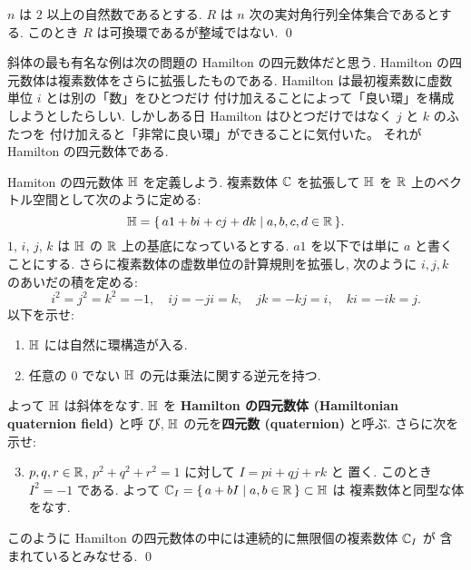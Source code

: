 \documentclass[12pt,twoside]{jarticle}
\begin{document}
\begin{example}
 $n$ は $2$ 以上の自然数であるとする.
 $R$ は $n$ 次の実対角行列全体集合であるとする.
 このとき $R$ は可換環であるが整域ではない.
 \qed
\end{example}

斜体の最も有名な例は次の問題の Hamilton の四元数体だと思う.
Hamilton の四元数体は複素数体をさらに拡張したものである.
Hamilton は最初複素数に虚数単位 $i$ とは別の「数」をひとつだけ
付け加えることによって「良い環」を構成しようとしたらしい.
しかしある日 Hamilton はひとつだけではなく $j$ と $k$ のふたつを
付け加えると「非常に良い環」ができることに気付いた。
それが Hamilton の四元数体である.

\begin{question}
 \label{q:quarternion-1}
 Hamiton の四元数体 ${\mathbb H}$ を定義しよう.
 複素数体 ${\mathbb C}$ を拡張して %
 ${\mathbb H}$ を ${\mathbb R}$ 上のベクトル空間として次のように定める:
 \begin{equation*}
  {\mathbb H} = \{\, a1 + bi + cj + dk \mid a,b,c,d\in{\mathbb R} \,\}.
 \end{equation*}
 $1$, $i$, $j$, $k$ は ${\mathbb H}$ の ${\mathbb R}$ 上の基底になっているとする.
 $a1$ を以下では単に $a$ と書くことにする.
 さらに複素数体の虚数単位の計算規則を拡張し, 
 次のように $i,j,k$ のあいだの積を定める:
 \begin{equation*}
  i^2=j^2=k^2=-1, \quad ij=-ji=k, \quad jk=-kj=i, \quad ki=-ik=j.
 \end{equation*}
 以下を示せ:
 \begin{enumerate}
  \item ${\mathbb H}$ には自然に環構造が入る.
  \item 任意の $0$ でない ${\mathbb H}$ の元は乗法に関する逆元を持つ.
 \end{enumerate}
 よって ${\mathbb H}$ は斜体をなす.
 ${\mathbb H}$ を {\bf Hamilton の四元数体 (Hamiltonian quaternion field)} と呼
 び, ${\mathbb H}$ の元を{\bf 四元数 (quaternion)} と呼ぶ.
 さらに次を示せ:
 \begin{enumerate}
  \setcounter{enumi}{2}
  \item $p,q,r\in{\mathbb R}$, $p^2+q^2+r^2=1$ に対して $I=pi+qj+rk$ と
   置く. このとき $I^2=-1$ である. 
  よって ${\mathbb C}_I=\{\,a+bI\mid a,b\in{\mathbb R}\,\}\subset{\mathbb H}$ は
  複素数体と同型な体をなす.
 \end{enumerate}
 このように Hamilton の四元数体の中には連続的に無限個の複素数体 ${\mathbb C}_I$ が
 含まれているとみなせる.
 \qed
\end{question}
\end{document}
